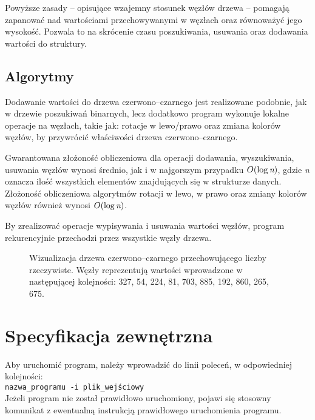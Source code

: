 \documentclass[12pt,a4paper,twoside]{article}
\begin{document}
Powyższe zasady – opisujące wzajemny stosunek węzłów drzewa – pomagają zapanować nad wartościami przechowywanymi w węzłach oraz równoważyć jego wysokość. Pozwala to na skrócenie czasu poszukiwania, usuwania oraz dodawania wartości do struktury.


\subsection{Algorytmy}

Dodawanie wartości do drzewa czerwono–czarnego jest realizowane podobnie, jak w drzewie poszukiwań binarnych, lecz dodatkowo program wykonuje lokalne operacje na węzłach, takie jak: rotacje w lewo/prawo oraz zmiana kolorów węzłów, by przywrócić właściwości drzewa czerwono–czarnego.

Gwarantowana złożoność obliczeniowa dla operacji dodawania, wyszukiwania, usuwania węzłów wynosi średnio, jak i w najgorszym przypadku $O(\log{\emph{n})}$, gdzie \emph{n} oznacza ilość wszystkich elementów znajdujących się w strukturze danych. \cite{id:PatonData} Złożoność obliczeniowa algorytmów rotacji w lewo, w prawo oraz zmiany kolorów węzłów również wynosi $O(\log{\emph{n})}$. \cite{id:Morris1998data}  

By zrealizować operacje wypisywania i usuwania wartości węzłów, program rekurencyjnie przechodzi przez wszystkie węzły drzewa.

\begin{figure}
\centering
\caption{Wizualizacja drzewa czerwono–czarnego przechowującego liczby rzeczywiste. Węzły reprezentują wartości wprowadzone w następującej kolejności: 327, 54, 224, 81, 703, 885, 192, 860, 265, 675.}
\label{fig:drzewko}
\end{figure}


\section{Specyfikacja zewnętrzna}
\label{sec:sp:zewnetrzna}

Aby uruchomić program, należy wprowadzić do linii poleceń, w odpowiedniej kolejności: \\
\indent\texttt{nazwa\_programu -i plik\_wejściowy} \\
Jeżeli program nie został prawidłowo uruchomiony, pojawi się stosowny komunikat z ewentualną instrukcją prawidłowego uruchomienia programu.

\end{document}
